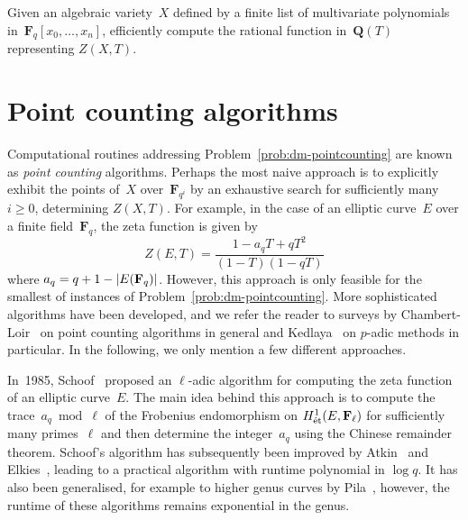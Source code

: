 \begin{prob} \label{prob:dm-pointcounting}
Given an algebraic variety~$X$ defined by a finite list of 
multivariate polynomials in~$\mathbf{F}_{q}[x_0, \dotsc, x_n]$, 
efficiently compute the rational function in~$\mathbf{Q}(T)$ 
representing $Z(X, T)$.
\end{prob}


\section{Point counting algorithms}

Computational routines addressing Problem~\ref{prob:dm-pointcounting} are 
known as \emph{point counting} algorithms.  Perhaps the most naive approach 
is to explicitly exhibit the points of~$X$ over~$\mathbf{F}_{q^i}$ by an 
exhaustive search for sufficiently many $i \geq 0$, determining $Z(X, T)$.  
For example, in the case of an elliptic curve~$E$ over a finite 
field~$\mathbf{F}_{q}$, the zeta function is given by 
\begin{equation*}
Z(E, T) = \frac{1 - a_q T + q T^2}{(1 - T)(1 - q T)}
\end{equation*}
where $a_q = q + 1 - \lvert E(\mathbf{F}_{q})\rvert$.  However, this 
approach is only feasible for the smallest of instances of 
Problem~\ref{prob:dm-pointcounting}.  More sophisticated algorithms 
have been developed, and we refer the reader to surveys by 
Chambert-Loir~\citep{ChambertLoir2008} on point counting algorithms 
in general and Kedlaya~\citep{Kedlaya2004} on $p$-adic methods in 
particular.  In the following, we only mention a few different approaches.

In~1985, Schoof~\citep{Schoof1985} proposed an $\ell$-adic algorithm for 
computing the zeta function of an elliptic curve~$E$.  The main idea behind 
this approach is to compute the trace~$a_q \bmod{\ell}$ of the Frobenius 
endomorphism on $H_{\text{\'et}}^{1}(E, \mathbf{F}_{\ell})$ for sufficiently 
many primes~$\ell$ and then determine the integer~$a_q$ using the Chinese 
remainder theorem.  Schoof's algorithm has subsequently been improved by 
Atkin~\citep{Atkin1988,Atkin1992} and Elkies~\citep{Elkies1991,Elkies1998}, 
leading to a practical algorithm with runtime polynomial in $\log q$.  
It has also been generalised, for example to higher genus curves by 
Pila~\citep{Pila1990}, however, the runtime of these algorithms remains 
exponential in the genus.

